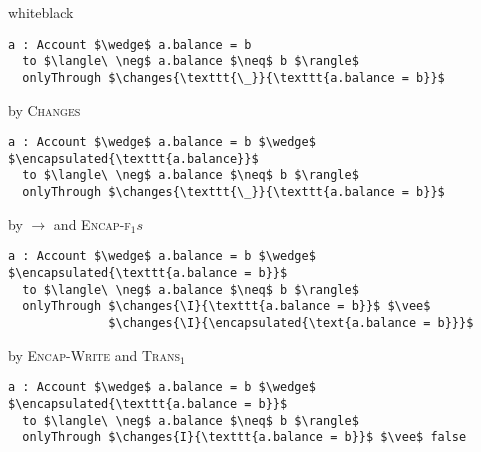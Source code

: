 \documentclass[acmsmall,review,anonymous]{acmart}\settopmatter{printfolios=true,printccs=false,printacmref=false}
\begin{document}
\begin{minipage}{\linewidth}
\begin{proofBox}{white}{black}
\footnotesize
\begin{minipage}{0.75\textwidth}
\begin{lstlisting}[language = Chainmail, mathescape=true, frame = single]
a : Account $\wedge$ a.balance = b 
  to $\langle\ \neg$ a.balance $\neq$ b $\rangle$ 
  onlyThrough $\changes{\texttt{\_}}{\texttt{a.balance = b}}$
\end{lstlisting}
\end{minipage}
\begin{minipage}{0.24\textwidth}
\scriptsize
\hfill by \textsc{Changes}
\end{minipage}
\begin{minipage}{0.75\textwidth}
\begin{lstlisting}[language = Chainmail, mathescape=true]
a : Account $\wedge$ a.balance = b $\wedge$ $\encapsulated{\texttt{a.balance}}$ 
  to $\langle\ \neg$ a.balance $\neq$ b $\rangle$ 
  onlyThrough $\changes{\texttt{\_}}{\texttt{a.balance = b}}$
\end{lstlisting}
\end{minipage}
\begin{minipage}{0.24\textwidth}
\scriptsize
\hfill by $\longrightarrow$ and \textsc{Encap-f}$_1s$
\end{minipage}
\begin{minipage}{0.75\textwidth}
\begin{lstlisting}[language = Chainmail, mathescape=true]
a : Account $\wedge$ a.balance = b $\wedge$ $\encapsulated{\texttt{a.balance = b}}$ 
  to $\langle\ \neg$ a.balance $\neq$ b $\rangle$ 
  onlyThrough $\changes{\I}{\texttt{a.balance = b}}$ $\vee$ 
              $\changes{\I}{\encapsulated{\text{a.balance = b}}}$
\end{lstlisting}
\end{minipage}
\begin{minipage}{0.24\textwidth}
\scriptsize
\hfill by \textsc{Encap-Write} and \textsc{Trans}$_1$
\end{minipage}
\begin{minipage}{0.75\textwidth}
\begin{lstlisting}[language = Chainmail, mathescape=true]
a : Account $\wedge$ a.balance = b $\wedge$ $\encapsulated{\texttt{a.balance = b}}$ 
  to $\langle\ \neg$ a.balance $\neq$ b $\rangle$ 
  onlyThrough $\changes{I}{\texttt{a.balance = b}}$ $\vee$ false

\end{lstlisting}
\end{minipage}
\end{proofBox}
\end{minipage}
\end{document}
